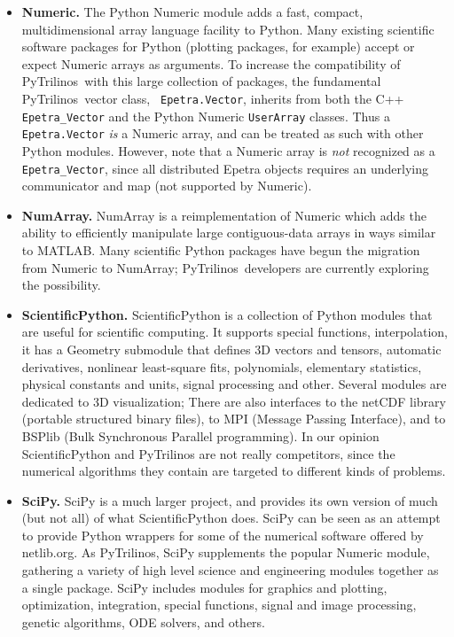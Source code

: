 \documentclass[acmtocl]{acmtrans2m}
\newcommand{\PyTrilinos}{{PyTrilinos}}
\begin{document}
\begin{itemize}

\item {\bf Numeric.} The Python Numeric module adds a fast, compact,
  multidimensional array language facility to Python.  Many existing
  scientific software packages for Python (plotting packages, for
  example) accept or expect Numeric arrays as arguments.  To increase
  the compatibility of \PyTrilinos\ with this large collection of
  packages, the fundamental \PyTrilinos\ vector class, {\tt
    Epetra.Vector}, inherits from both the C++ {\tt Epetra\_Vector}
  and the Python Numeric {\tt UserArray} classes.  Thus a {\tt
    Epetra.Vector} {\sl is} a Numeric array, and can be treated as
  such with other Python modules.  However, note that a Numeric array
  is {\sl not} recognized as a {\tt Epetra\_Vector}, since all
  distributed Epetra objects requires an underlying communicator and
  map (not supported by Numeric).

\item {\bf NumArray.}  NumArray is a reimplementation of Numeric which
  adds the ability to efficiently manipulate large contiguous-data
  arrays in ways similar to MATLAB.  Many scientific Python packages
  have begun the migration from Numeric to NumArray; \PyTrilinos\
  developers are currently exploring the possibility.

\item {\bf ScientificPython.}  ScientificPython is a collection of
  Python modules that are useful for scientific computing. It supports special
  functions, interpolation, it has a Geometry submodule that defines 3D
  vectors and tensors, automatic derivatives, nonlinear least-square fits,
  polynomials, elementary statistics, physical constants and units, signal
  processing and other.
  Several modules are dedicated to 3D visualization;
  There are also interfaces to the netCDF library (portable
  structured binary files), to MPI (Message Passing Interface), and to
  BSPlib (Bulk Synchronous Parallel programming). In our opinion
  ScientificPython and PyTrilinos are not really competitors, since the
  numerical algorithms they contain are targeted to different kinds of
  problems.

\item {\bf SciPy.} SciPy is a much larger project, and provides its own
  version of much (but not all) of what ScientificPython does. SciPy can be seen
  as an attempt to provide Python wrappers for some of the numerical software
  offered by netlib.org.
  As PyTrilinos, SciPy supplements the popular Numeric module, gathering
  a variety of high level science and engineering modules together as
  a single package. SciPy includes modules for graphics and plotting,
  optimization, integration, special functions, signal and image
  processing, genetic algorithms, ODE solvers, and others. 
  

\end{itemize}
\end{document}
